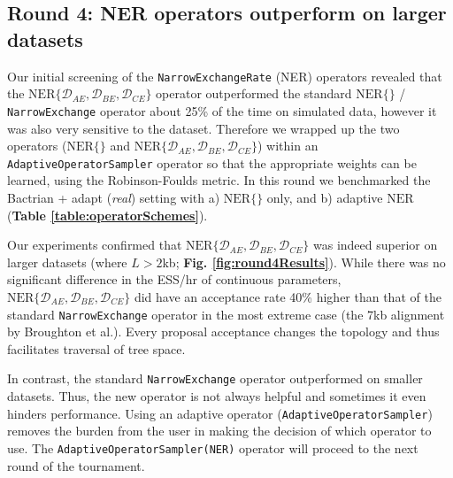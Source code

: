 \documentclass[10pt,letterpaper]{article}
\begin{document}
\subsection*{Round 4: NER operators outperform on larger datasets}


Our initial screening of the \texttt{NarrowExchangeRate} (NER) operators revealed that the $\text{NER}\{\mathcal{D}_{AE}, \mathcal{D}_{BE}, \mathcal{D}_{CE}\}$ operator outperformed the standard $\text{NER} \{\}$ / \texttt{NarrowExchange} operator about 25\% of the time on simulated data, however it was also very sensitive to the dataset. 
Therefore we wrapped up the two operators ($\text{NER} \{\}$ and $\text{NER}\{\mathcal{D}_{AE}, \mathcal{D}_{BE}, \mathcal{D}_{CE}\}$) within an \texttt{AdaptiveOperatorSampler} operator so that the appropriate weights can be learned, using the Robinson-Foulds metric.
In this round we benchmarked the Bactrian + adapt (\textit{real})  setting with a) $\text{NER} \{\}$ only, and b) adaptive $\text{NER}$ (\textbf{Table \ref{table:operatorSchemes}}).


Our experiments confirmed that $\text{NER}\{\mathcal{D}_{AE}, \mathcal{D}_{BE}, \mathcal{D}_{CE}\}$ was indeed superior on larger datasets (where $L > 2$kb; \textbf{Fig. \ref{fig:round4Results}}).
While there was no significant difference in the ESS/hr of continuous parameters, $\text{NER}\{\mathcal{D}_{AE}, \mathcal{D}_{BE}, \mathcal{D}_{CE}\}$ did have an acceptance rate 40\% higher than that of the standard \texttt{NarrowExchange} operator in the most extreme case (the 7kb alignment by Broughton et al.\cite{Broughton_2013}).
Every proposal acceptance changes the topology and thus facilitates traversal of tree space. 


In contrast, the standard \texttt{NarrowExchange} operator outperformed on smaller datasets.
Thus, the new operator is not always helpful and sometimes it even hinders performance.
Using an adaptive operator (\texttt{AdaptiveOperatorSampler}) removes the burden from the user in making the decision of which operator to use.
The \texttt{AdaptiveOperatorSampler(NER)} operator will proceed to the next round of the tournament.
\end{document}
